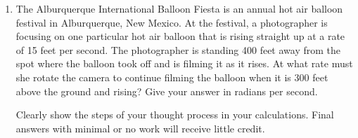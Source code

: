 \documentclass{article}
\begin{document}
\begin{enumerate}
\begin{enumerate}
      \begin{solution}
        $\cos^{-1} \left( \frac{2}{3} \right)$ is the angle in $[0, \pi]$
        whose cosine is $\frac{2}{3}$; we can picture it as the red angle
        below: 
        \begin{center}
        \end{center}
        By the Pythagorean Theorem, the blue triangle has height
        $\sqrt{5}$.  So, the tangent of this angle is
        $\frac{\sqrt{5}}{2}$, and $2 \tan \left( \cos^{-1} \frac{2}{3}
        \right) = \boxed{\sqrt{5}}$.         
      \end{solution}

    \end{enumerate}







\pspace{\newpage}

\item The Alburquerque International Balloon Fiesta is an annual hot air balloon festival in Alburquerque, New Mexico. At the festival, a photographer is focusing on one particular hot air balloon that is rising straight up at a rate of 15 feet per second. The photographer is standing 400 feet away from the spot where the balloon took off and is filming it as it rises. At what rate must she rotate the camera to continue filming the balloon when it is 300 feet above the ground and rising? Give your answer in radians per second. 

Clearly show the steps of your thought process in your calculations. Final answers with minimal or no work will receive little credit.


\end{enumerate}
\end{document}
